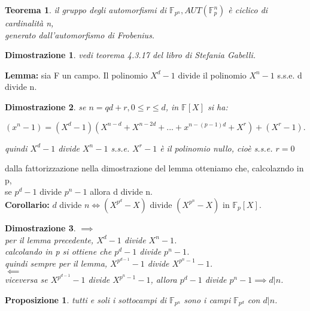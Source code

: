 \documentclass[a4paper,12pt]{article}
\theoremstyle{def}
\theoremstyle{prop}
\newtheorem*{proposition}{Proposizione}
\theoremstyle{esempio}
\theoremstyle{dimostrazione}
\newtheorem*{dimostrazione}{Dimostrazione}
\theoremstyle{teo}
\newtheorem*{teorema}{Teorema}
\theoremstyle{osservazione}
\begin{document}
\begin{teorema}
	il gruppo degli automorfismi di \(\mathbb{F}_{p^n}, AUT(\mathbb{F}_p^n)\) è ciclico di cardinalità n,\\
	generato dall'automorfismo di Frobenius.
\end{teorema}

\begin{dimostrazione}
	vedi teorema 4.3.17 del libro di Stefania Gabelli. 
\end{dimostrazione}

\textbf{Lemma:} sia F un campo. Il polinomio \(X^d - 1\) divide il polinomio \(X^n - 1\) s.s.e. d divide n.

\begin{dimostrazione}
	se \(n = qd + r, 0 \leq r \leq d\), in \(\mathbb{F}[X]\) si ha:
	\begin{center}
		\((x^n - 1) = (X^d - 1)(X^{n-d} + X^{n-2d} + ... + x^{n-(p-1)d} + X^r) + (X^r -1).\)\\
	\end{center}
	quindi \(X^d - 1\) divide \(X^n - 1\) s.s.e. \(X^r - 1\) è il polinomio nullo, cioè s.s.e. \(r = 0\)
\end{dimostrazione}

\vspace{\baselineskip}

dalla fattorizzazione nella dimostrazione del lemma otteniamo che, calcolazndo in p,\\
se \(p^d - 1\) divide \(p^n - 1\) allora d divide n.\\

\textbf{Corollario:} \(d\) divide \(n \iff (X^{p^d} - X)\) divide \((X^{p^n} - X)\) in \(\mathbb{F}_p[X]\).

\begin{dimostrazione}
	\(\implies\)\\
	per il lemma precedente, \(X^d - 1\) divide \(X^n - 1\).\\
	calcolando in p si ottiene che \(p^d - 1\) divide \(p^n - 1\).\\
	quindi sempre per il lemma, \(X^{p^{d - 1}} - 1\) divide \(X^{p^n - 1} - 1\).\\
	\(\impliedby\)\\
	viceversa se \(X^{p^{d - 1}} - 1\) divide \(X^{p^n -1 } - 1\), allora \(p^d - 1\) divide \(p^n - 1 \implies d | n\).\\
\end{dimostrazione}

\begin{proposition}
	tutti e soli i sottocampi di \(\mathbb{F}_{p^n}\) sono i campi \(\mathbb{F}_{p^d}\) con \(d | n\).
\end{proposition}
\end{document}
